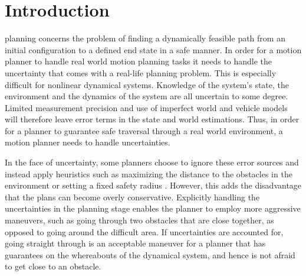 
\section{Introduction}
 planning concerns the problem of finding a dynamically
feasible path from an initial configuration to a defined end state in a safe
manner. In order for a motion planner to handle real world motion planning tasks
it needs to handle the uncertainty that comes with a real-life planning problem.
This is especially difficult for nonlinear dynamical systems. Knowledge of
the system's state, the environment and the dynamics of the system are all uncertain to
some degree. Limited measurement precision and use of imperfect world and vehicle models will therefore leave error terms in the state and world estimations.
Thus, in order for a planner to guarantee safe traversal through a real world environment, a motion planner needs to handle uncertainties.

In the face of uncertainty, some planners choose to ignore these error sources
and instead apply heuristics such as maximizing the distance to the obstacles in
the environment or setting a fixed safety radius \cite{Hoy2015ClutteredEnvironmentSurvey}.
However, this adds the disadvantage that the plans can become overly conservative. 
Explicitly handling the uncertainties in the planning stage enables the planner to employ more aggressive maneuvers, such as going through two obstacles that are close together, as opposed to going around the difficult area. 
If uncertainties are accounted for, going straight through is an acceptable maneuver for a planner that has guarantees on the whereabouts of the dynamical system, and hence is not afraid to get close to an obstacle.




%


